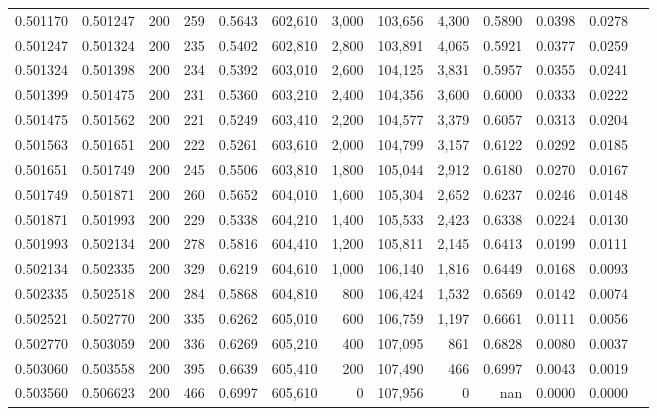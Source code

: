 \begin{tabular}{rrrrrrrrrrrrr}
0.501170 & 0.501247 &    200 & 259 &                                     0.5643 & 602,610 &   3,000 & 103,656 &   4,300 & 0.5890 & 0.0398 & 0.0278 \\
0.501247 & 0.501324 &    200 & 235 &                                     0.5402 & 602,810 &   2,800 & 103,891 &   4,065 & 0.5921 & 0.0377 & 0.0259 \\
0.501324 & 0.501398 &    200 & 234 &                                     0.5392 & 603,010 &   2,600 & 104,125 &   3,831 & 0.5957 & 0.0355 & 0.0241 \\
0.501399 & 0.501475 &    200 & 231 &                                     0.5360 & 603,210 &   2,400 & 104,356 &   3,600 & 0.6000 & 0.0333 & 0.0222 \\
0.501475 & 0.501562 &    200 & 221 &                                     0.5249 & 603,410 &   2,200 & 104,577 &   3,379 & 0.6057 & 0.0313 & 0.0204 \\
0.501563 & 0.501651 &    200 & 222 &                                     0.5261 & 603,610 &   2,000 & 104,799 &   3,157 & 0.6122 & 0.0292 & 0.0185 \\
0.501651 & 0.501749 &    200 & 245 &                                     0.5506 & 603,810 &   1,800 & 105,044 &   2,912 & 0.6180 & 0.0270 & 0.0167 \\
0.501749 & 0.501871 &    200 & 260 &                                     0.5652 & 604,010 &   1,600 & 105,304 &   2,652 & 0.6237 & 0.0246 & 0.0148 \\
0.501871 & 0.501993 &    200 & 229 &                                     0.5338 & 604,210 &   1,400 & 105,533 &   2,423 & 0.6338 & 0.0224 & 0.0130 \\
0.501993 & 0.502134 &    200 & 278 &                                     0.5816 & 604,410 &   1,200 & 105,811 &   2,145 & 0.6413 & 0.0199 & 0.0111 \\
0.502134 & 0.502335 &    200 & 329 &                                     0.6219 & 604,610 &   1,000 & 106,140 &   1,816 & 0.6449 & 0.0168 & 0.0093 \\
0.502335 & 0.502518 &    200 & 284 &                                     0.5868 & 604,810 &     800 & 106,424 &   1,532 & 0.6569 & 0.0142 & 0.0074 \\
0.502521 & 0.502770 &    200 & 335 &                                     0.6262 & 605,010 &     600 & 106,759 &   1,197 & 0.6661 & 0.0111 & 0.0056 \\
0.502770 & 0.503059 &    200 & 336 &                                     0.6269 & 605,210 &     400 & 107,095 &     861 & 0.6828 & 0.0080 & 0.0037 \\
0.503060 & 0.503558 &    200 & 395 &                                     0.6639 & 605,410 &     200 & 107,490 &     466 & 0.6997 & 0.0043 & 0.0019 \\
0.503560 & 0.506623 &    200 & 466 &                                     0.6997 & 605,610 &       0 & 107,956 &       0 &    nan & 0.0000 & 0.0000 \\
\bottomrule
\end{tabular}
